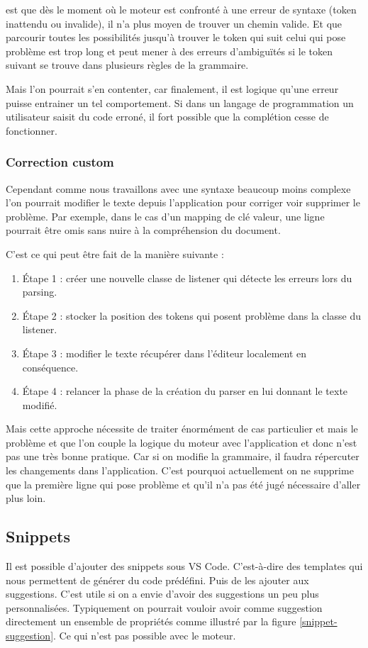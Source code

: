 \documentclass[
    iict, %
    il, %
]{heig-tb}
\begin{document}
est que dès le moment où le moteur est confronté à une erreur de syntaxe (token inattendu ou invalide), il n'a plus moyen de trouver un chemin valide.
Et que parcourir toutes les possibilités jusqu'à trouver le token qui suit celui qui pose problème est trop long et peut mener à des erreurs d'ambiguïtés si le token suivant se trouve dans plusieurs règles de la grammaire.

Mais l'on pourrait s'en contenter, car finalement, il est logique qu'une erreur puisse entrainer un tel comportement.
Si dans un langage de programmation un utilisateur saisit du code erroné, il fort possible que la complétion cesse de fonctionner.

\subsubsection{Correction custom}
Cependant comme nous travaillons avec une syntaxe beaucoup moins complexe l'on pourrait modifier le texte depuis l'application pour corriger voir supprimer le problème.
Par exemple, dans le cas d'un mapping de clé valeur, une ligne pourrait être omis sans nuire à la compréhension du document.

C'est ce qui peut être fait de la manière suivante :
\begin{enumerate}
    \item Étape 1 : créer une nouvelle classe de listener qui détecte les erreurs lors du parsing.
    \item Étape 2 : stocker la position des tokens qui posent problème dans la classe du listener.
    \item Étape 3 : modifier le texte récupérer dans l'éditeur localement en conséquence.
    \item Étape 4 : relancer la phase de la création du parser en lui donnant le texte modifié.
\end{enumerate}

Mais cette approche nécessite de traiter énormément de cas particulier et mais le problème et que l'on couple la logique du moteur avec l'application et donc n'est pas une très bonne pratique.
Car si on modifie la grammaire, il faudra répercuter les changements dans l'application.
C'est pourquoi actuellement on ne supprime que la première ligne qui pose problème et qu'il n'a pas été jugé nécessaire d'aller plus loin.

\subsection{Snippets}
Il est possible d'ajouter des snippets sous VS Code. C'est-à-dire des templates qui nous permettent de générer du code prédéfini. Puis de les ajouter aux suggestions.
C'est utile si on a envie d'avoir des suggestions un peu plus personnalisées.
Typiquement on pourrait vouloir avoir comme suggestion directement un ensemble de propriétés comme illustré par la figure \ref*{snippet-suggestion}.
Ce qui n'est pas possible avec le moteur.
\end{document}
